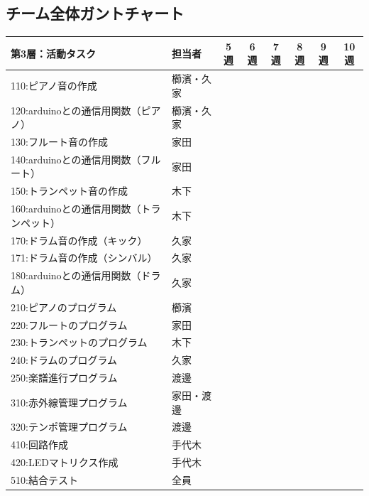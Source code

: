 \documentclass[a4paper,11pt]{ltjsarticle}
\providecommand{\％}{\%}
\begin{document}
\begingroup
\setlength{\tabcolsep}{3pt}

\subsection{チーム全体ガントチャート}\label{sec:gantt-team}

\begin{longtable}{|p{6.2cm}|p{2.3cm}|c|c|c|c|c|c|}
\hline
\rowcolor[gray]{0.9}
第3層：活動タスク & 担当者 & 5週 & 6週 & 7週 & 8週 & 9週 & 10週 \\
\hline
110:ピアノ音の作成 & 櫛濱・久家 & \cellcolor{ganttCell} & & \cellcolor{ganttCell} & & & \\
\hline
120:arduinoとの通信用関数（ピアノ） & 櫛濱・久家 & \cellcolor{ganttCell} & & & & & \\
\hline
130:フルート音の作成 & 家田 & \cellcolor{ganttCell} & & & & & \\
\hline
140:arduinoとの通信用関数（フルート） & 家田 & \cellcolor{ganttCell} & & & & & \\
\hline
150:トランペット音の作成 & 木下 & \cellcolor{ganttCell} & & & & & \\
\hline
160:arduinoとの通信用関数（トランペット） & 木下 & \cellcolor{ganttCell} & & & & & \\
\hline
170:ドラム音の作成（キック） & 久家 & & \cellcolor{ganttCell} & & & & \\
\hline
171:ドラム音の作成（シンバル） & 久家 & & \cellcolor{ganttCell} & & & & \\
\hline
180:arduinoとの通信用関数（ドラム） & 久家 & & \cellcolor{ganttCell} & & & & \\
\hline
210:ピアノのプログラム & 櫛濱 & \cellcolor{ganttCell} & & & & & \\
\hline
220:フルートのプログラム & 家田 & \cellcolor{ganttCell} & & & & & \\
\hline
230:トランペットのプログラム & 木下 & \cellcolor{ganttCell} & & & & & \\
\hline
240:ドラムのプログラム & 久家 & & \cellcolor{ganttCell} & & & & \\
\hline
250:楽譜進行プログラム & 渡邊 & & \cellcolor{ganttCell} & \cellcolor{ganttCell} & \cellcolor{ganttCell} & & \\
\hline
310:赤外線管理プログラム & 家田・渡邊 & & \cellcolor{ganttCell} & \cellcolor{ganttCell} & \cellcolor{ganttCell} & & \\
\hline
320:テンポ管理プログラム & 渡邊 & & \cellcolor{ganttCell} & & & & \\
\hline
410:回路作成 & 手代木 & & \cellcolor{ganttCell} & & & & \\
\hline
420:LEDマトリクス作成 & 手代木 & & \cellcolor{ganttCell} & \cellcolor{ganttCell} & \cellcolor{ganttCell} & & \\
\hline
510:結合テスト & 全員 & & & & \cellcolor{ganttCell} & \cellcolor{ganttCell} & \cellcolor{ganttCell} \\
\hline
\end{longtable}
\end{document}
